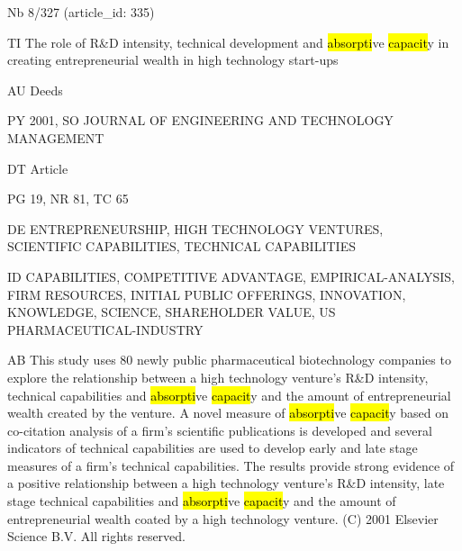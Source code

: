 \documentclass[a4paper]{article}
\begin{document}
\vspace*{-2cm}
Nb \tabto{0cm}8/327 (article\_id: 335)\par
TI \tabto{0cm}The role of R\&D intensity, technical development and \hl{absorpti}ve \hl{capacit}y in creating entrepreneurial wealth in high technology start-ups\par
AU \tabto{0cm}Deeds\par
PY \tabto{0cm}2001, SO JOURNAL OF ENGINEERING AND TECHNOLOGY MANAGEMENT\par
DT \tabto{0cm}Article\par
PG \tabto{0cm}19, NR 81, TC 65\par
DE \tabto{0cm}ENTREPRENEURSHIP, HIGH TECHNOLOGY VENTURES, SCIENTIFIC CAPABILITIES, TECHNICAL CAPABILITIES\par
ID \tabto{0cm}CAPABILITIES, COMPETITIVE ADVANTAGE, EMPIRICAL-ANALYSIS, FIRM RESOURCES, INITIAL PUBLIC OFFERINGS, INNOVATION, KNOWLEDGE, SCIENCE, SHAREHOLDER VALUE, US PHARMACEUTICAL-INDUSTRY\par
AB \tabto{0cm}This study uses 80 newly public pharmaceutical biotechnology companies to explore the relationship between a high technology venture's R\&D intensity, technical capabilities and \hl{absorpti}ve \hl{capacit}y and the amount of entrepreneurial wealth created by the venture. A novel measure of \hl{absorpti}ve \hl{capacit}y based on co-citation analysis of a firm's scientific publications is developed and several indicators of technical capabilities are used to develop early and late stage measures of a firm's technical capabilities. The results provide strong evidence of a positive relationship between a high technology venture's R\&D intensity, late stage technical capabilities and \hl{absorpti}ve \hl{capacit}y and the amount of entrepreneurial wealth coated by a high technology venture. (C) 2001 Elsevier Science B.V. All rights reserved.\par
\clearpage
\end{document}
